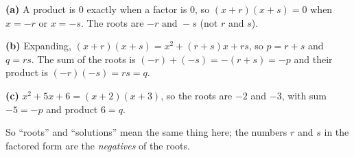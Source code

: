 \textbf{(a)} A product is $0$ exactly when a factor is $0$, so $(x+r)(x+s)=0$ when $x=-r$ or $x=-s$. The roots are $\boxed{-r\text{ and }-s}$ (not $r$ and $s$).

\textbf{(b)} Expanding, $(x+r)(x+s)=x^2+(r+s)x+rs$, so $p=r+s$ and $q=rs$. The sum of the roots is $(-r)+(-s)=-(r+s)=\boxed{-p}$ and their product is $(-r)(-s)=rs=\boxed{q}$.

\textbf{(c)} $x^2+5x+6=(x+2)(x+3)$, so the roots are $-2$ and $-3$, with sum $-5=-p$ and product $6=q$.

So ``roots'' and ``solutions'' mean the same thing here; the numbers $r$ and $s$ in the factored form are the \emph{negatives} of the roots.
